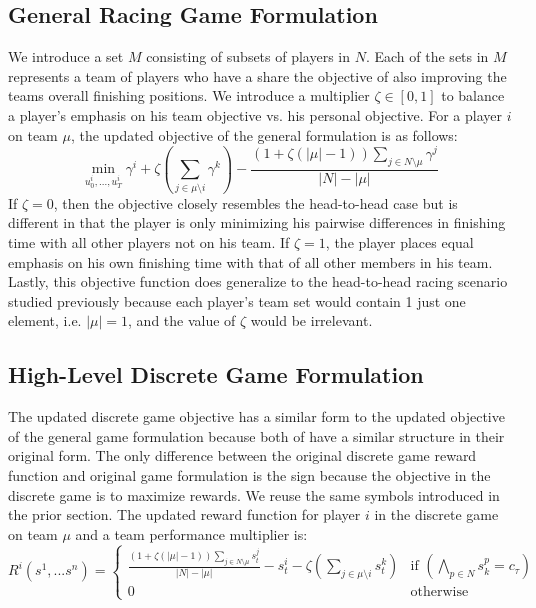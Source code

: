 \subsection{General Racing Game Formulation}
We introduce a set $M$ consisting of subsets of players in $N$. Each of the sets in $M$ represents a team of players who have a share the objective of also improving the teams overall finishing positions. We introduce a multiplier $\zeta \in [0,1]$ to balance a player's emphasis on his team objective vs. his personal objective. For a player $i$ on team $\mu$, the updated objective of the general formulation is as follows:
\begin{equation} \label{eq:gen_team_obj}
    \min_{u^i_0, ..., u^i_T} \gamma^i+\zeta (\sum_{j \in \mu \setminus i} \gamma^k) - \frac{(1+\zeta(|\mu|-1))\sum_{j \in N \setminus \mu }\gamma^j}{|N|-|\mu|} 
\end{equation}
If $\zeta=0$, then the objective closely resembles the head-to-head case but is different in that the player is only minimizing his pairwise differences in finishing time with all other players not on his team. If $\zeta=1$, the player places equal emphasis on his own finishing time with that of all other members in his team. Lastly, this objective function does generalize to the head-to-head racing scenario studied previously because each player's team set would contain 1 just one element, i.e. $|\mu|=1$, and the value of $\zeta$ would be irrelevant. 

\subsection{High-Level Discrete Game Formulation}
The updated discrete game objective has a similar form to the updated objective of the general game formulation because both of have a similar structure in their original form. The only difference between the original discrete game reward function and original game formulation is the sign because the objective in the discrete game is to maximize rewards. We reuse the same symbols introduced in the prior section. The updated reward function for player $i$ in the discrete game on team $\mu$ and a team performance multiplier is:
\begin{equation}
    R^i(s^1, ... s^n) = \begin{cases} 
                \frac{(1+\zeta(|\mu|-1))\sum_{j \in N \setminus \mu} s^j_t}{|N|-|\mu|} - s^i_t - \zeta(\sum_{j \in \mu \setminus i} s^k_t) & \text{if } (\bigwedge_{p \in N} s^p_k   = c_\tau) \\ 
                0    & \text{otherwise}
                \end{cases}
\end{equation}

